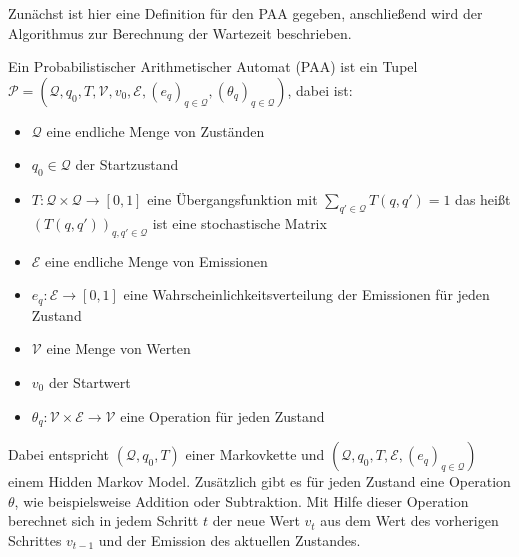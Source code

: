 Zunächst ist hier eine Definition für den PAA gegeben, anschließend wird der Algorithmus zur Berechnung der Wartezeit beschrieben.


\begin{definition}[PAA]
 Ein Probabilistischer Arithmetischer Automat (PAA) ist ein Tupel
 $ \mathcal{P} = (\mathcal{Q}, q_0, T, \mathcal{V}, v_0, \mathcal{E}, (e_q)_{q\in\mathcal{Q}}, (\theta_q)_{q\in\mathcal{Q}})$, dabei ist:
 \begin{itemize}
  \item $\mathcal{Q}$ eine endliche Menge von Zuständen
  \item $q_0 \in \mathcal{Q}$ der Startzustand
  \item $T: \mathcal{Q} \times \mathcal{Q} \rightarrow [0,1]$ eine Übergangsfunktion mit $\sum_{q' \in \mathcal{Q}} T(q, q') = 1 $ das heißt $(T(q,q'))_{q,q' \in \mathcal{Q}}$ ist eine stochastische Matrix
  \item $\mathcal{E}$ eine endliche Menge von Emissionen
  \item $e_q: \mathcal{E} \rightarrow [0,1]$ eine Wahrscheinlichkeitsverteilung der Emissionen für jeden Zustand
  \item $\mathcal{V}$ eine Menge von Werten
  \item $v_0$ der Startwert
  \item $\theta_q: \mathcal{V} \times \mathcal{E} \rightarrow \mathcal{V}$ eine Operation für jeden Zustand
 \end{itemize}
\end{definition}
Dabei entspricht $(\mathcal{Q}, q_0, T)$ einer Markovkette und $(\mathcal{Q}, q_0, T, \mathcal{E}, (e_q)_{q\in\mathcal{Q}})$ einem Hidden Markov Model. %
Zusätzlich gibt es für jeden Zustand eine Operation $\theta$, wie beispielsweise Addition oder Subtraktion. Mit Hilfe dieser Operation berechnet sich in jedem Schritt $t$ der neue Wert $v_t$ aus dem Wert des vorherigen Schrittes $v_{t-1}$ und der Emission des aktuellen Zustandes.

